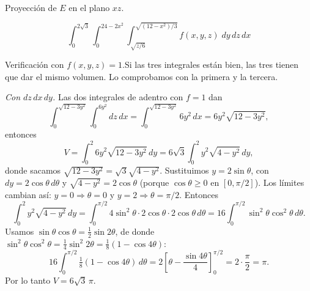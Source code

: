 \begin{respuesta}
\begin{center}
    \small Proyección de $E$ en el plano $xz$.
    \end{center}
    \[
        \boxed{\;\int_{0}^{2\sqrt{3}}\int_{0}^{24-2x^2}\int_{\sqrt{z/6}}^{\sqrt{(12-x^2)/3}} f(x,y,z)\; dy\,dz\,dx\;}
    \]

    \bigskip
    Verificación con $f(x,y,z)=1$.Si las tres integrales están bien,
    las tres tienen que dar el mismo volumen. Lo comprobamos con la primera y la tercera.

    \medskip
    \emph{Con $dz\,dx\,dy$.} Las dos integrales de adentro con $f=1$ dan
    \[
        \int_{0}^{\sqrt{12-3y^2}}\int_{0}^{6y^2} dz\,dx = \int_{0}^{\sqrt{12-3y^2}} 6y^2\,dx = 6y^2\sqrt{12-3y^2},
    \]
    entonces
    \[
        V = \int_0^2 6y^2\sqrt{12-3y^2}\,dy = 6\sqrt{3}\int_0^2 y^2\sqrt{4-y^2}\,dy ,
    \]
    donde sacamos $\sqrt{12-3y^2}=\sqrt{3}\sqrt{4-y^2}$. Sustituimos $y=2\sin\theta$,
    con $dy=2\cos\theta\,d\theta$ y $\sqrt{4-y^2}=2\cos\theta$ (porque $\cos\theta\geq0$ en
    $[0,\pi/2]$). Los límites cambian así: $y=0\Rightarrow\theta=0$ y
    $y=2\Rightarrow\theta=\pi/2$. Entonces
    \[
        \int_0^2 y^2\sqrt{4-y^2}\,dy = \int_0^{\pi/2} 4\sin^2\theta\cdot 2\cos\theta\cdot 2\cos\theta\, d\theta
        = 16\int_0^{\pi/2}\sin^2\theta\cos^2\theta\, d\theta .
    \]
    Usamos $\sin\theta\cos\theta=\tfrac12\sin 2\theta$, de donde
    $\sin^2\theta\cos^2\theta=\tfrac14\sin^2 2\theta=\tfrac18(1-\cos 4\theta)$:
    \[
        16\int_0^{\pi/2}\tfrac18(1-\cos4\theta)\,d\theta
        = 2\left[\theta-\frac{\sin 4\theta}{4}\right]_0^{\pi/2} = 2\cdot\frac{\pi}{2} = \pi .
    \]
    Por lo tanto $V = 6\sqrt{3}\,\pi$.


\end{respuesta}
